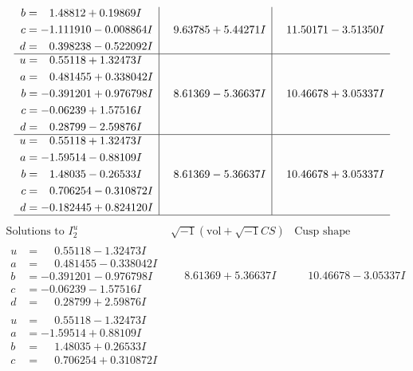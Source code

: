 \documentclass[1p]{elsarticle_modified}
\theoremstyle{definition}
\newcommand{\I}{\sqrt{-1}}
\begin{document}
$$\begin{array}{c|c|c}
\begin{aligned}
b &= \phantom{-}1.48812 + 0.19869 I \\
c &= -1.111910 - 0.008864 I \\
d &= \phantom{-}0.398238 - 0.522092 I\end{aligned}
 & \phantom{-}9.63785 + 5.44271 I & \phantom{-}11.50171 - 3.51350 I \\ \hline\begin{aligned}
u &= \phantom{-}0.55118 + 1.32473 I \\
a &= \phantom{-}0.481455 + 0.338042 I \\
b &= -0.391201 + 0.976798 I \\
c &= -0.06239 + 1.57516 I \\
d &= \phantom{-}0.28799 - 2.59876 I\end{aligned}
 & \phantom{-}8.61369 - 5.36637 I & \phantom{-}10.46678 + 3.05337 I \\ \hline\begin{aligned}
u &= \phantom{-}0.55118 + 1.32473 I \\
a &= -1.59514 - 0.88109 I \\
b &= \phantom{-}1.48035 - 0.26533 I \\
c &= \phantom{-}0.706254 - 0.310872 I \\
d &= -0.182445 + 0.824120 I\end{aligned}
 & \phantom{-}8.61369 - 5.36637 I & \phantom{-}10.46678 + 3.05337 I\\
 \hline 
 \end{array}$$\newpage$$\begin{array}{c|c|c}  
\text{Solutions to }I^u_{2}& \I (\text{vol} + \sqrt{-1}CS) & \text{Cusp shape}\\
 \hline 
\begin{aligned}
u &= \phantom{-}0.55118 - 1.32473 I \\
a &= \phantom{-}0.481455 - 0.338042 I \\
b &= -0.391201 - 0.976798 I \\
c &= -0.06239 - 1.57516 I \\
d &= \phantom{-}0.28799 + 2.59876 I\end{aligned}
 & \phantom{-}8.61369 + 5.36637 I & \phantom{-}10.46678 - 3.05337 I \\ \hline\begin{aligned}
u &= \phantom{-}0.55118 - 1.32473 I \\
a &= -1.59514 + 0.88109 I \\
b &= \phantom{-}1.48035 + 0.26533 I \\
c &= \phantom{-}0.706254 + 0.310872 I \\

\end{aligned}
\end{array}$$
\end{document}

